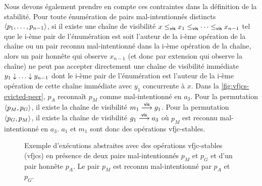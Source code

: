Nous devons également prendre en compte ces contraintes dans la définition de la stabilité.
Pour toute énumération de pairs mal-intentionnés distincts $\tuple*{p_1, \dotsc ,p_{n-1}}$, si il existe une chaîne de visibilité $x \viseq x_1 \viseq \dotsb \viseq x_{n-1}$ tel que le i-ème pair de l'énumération est soit l'auteur de la i-ème opération de la chaîne ou un pair reconnu mal-intentionné dans la i-ème opération de la chaîne, alors un pair honnête qui observe $x_{n-1}$ (et donc par extension qui observe la chaîne) ne peut pas accepter directement une chaîne de visibilité immédiate $y_1 \idr \dotsc \idr y_{n-1}$ dont le i-ème pair de l'énumération est l'auteur de la i-ème opération de cette chaîne immédiate avec $y_1$ concurrente à $x$.
Dans la \autoref{fig:vfjcs-evicted-peer}, $p_A$ reconnaît $p_M$ comme mal-intentionné en $a_3$.
Pour la permutation $\tuple*{p_M, p_G}$, il existe la chaîne de visibilité $m_1 \vis g_1$.
Pour la permutation $\tuple*{p_G, p_M}$, il existe la chaîne de visibilité $g_1 \vis a_3$ où $p_M$ est reconnu mal-intentionné en $a_3$.
$a_1$ et $m_1$ sont donc des opérations vfjc-stables.

\begin{figure}[htb]
\centering
{}
\caption{Exemple d'exécutions abstraites avec des opérations vfjc-stables (vfjcs) en présence de deux pairs mal-intentionnés $p_M$ et $p_G$ et d'un pair honnête $p_A$.
Le pair $p_M$ est reconnu mal-intentionné par $p_A$ et $p_G$.}\label{fig:vfjcs-evicted-peer}
\end{figure}


